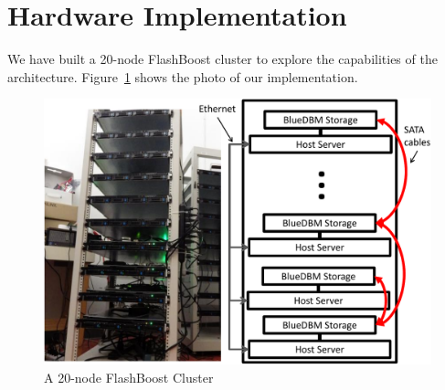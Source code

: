 \section{Hardware Implementation}
\label{sec:implementation}

We have built a 20-node FlashBoost cluster to explore the capabilities of the
architecture. Figure~\ref{fig:bluedbmcluster} shows the photo of our
implementation.

\begin{figure}[ht]
	\begin{center}
	\includegraphics[width=0.4\paperwidth]{figures/rackserver-crop.pdf}
	\caption{A 20-node FlashBoost Cluster}
	\label{fig:bluedbmcluster}
	\end{center}
\end{figure}

%

